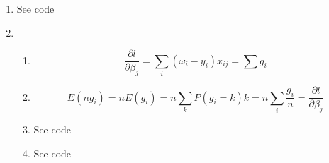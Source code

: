 \documentclass{article}
\begin{document}
\begin{enumerate}
\item
See code
\item
\begin{enumerate}[A]
\item
\[
\frac{\partial l}{\partial\beta_j}=\sum_i(\omega_i-y_i)x_{ij}=\sum g_i
\]
\item
\[
E(ng_i)=nE(g_i)=n\sum_kP(g_i=k)k=n\sum_i\frac{g_i}{n}=\frac{\partial l}{\partial\beta_j}
\]
\item
See code
\item
See code
\end{enumerate}
\end{enumerate}
\end{document}
